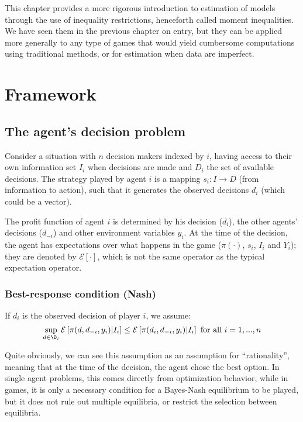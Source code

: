 This chapter provides a more rigorous introduction to estimation of models through the use of inequality restrictions, henceforth called moment inequalities. We have seen them in the previous chapter on entry, but they can be applied more generally to any type of games that would yield cumbersome computations using traditional methods, or for estimation when data are imperfect.

\section{Framework}

\subsection{The agent's decision problem}

Consider a situation with $n$ decision makers indexed by $i$, having access to their own information set $I_i$ when decisions are made and $D_i$ the set of available decisions. The strategy played by agent $i$ is a mapping $s_i:I \to D$ (from information to action), such that it generates the observed decisions $d_i$ (which could be a vector). 

The profit function of agent $i$ is determined by his decision ($d_i$), the other agents' decisions ($d_{-i}$) and other environment variables $y_i$. At the time of the decision, the agent has expectations over what happens in the game ($\pi(\cdot)$, $s_i$, $I_i$ and $Y_i$); they are denoted by $\mathcal{E}\left[\cdot\right]$, which is not the same operator as the typical expectation operator.

\subsubsection{Best-response condition (Nash)}

If $d_i$ is the observed decision of player $i$, we assume: $$ \sup_{d\in\D_i} \mathcal{E}\left[ \pi(d, d_{-i}, y_i) | I_i \right] \leq \mathcal{E}\left[ \pi(d_i, d_{-i}, y_i) | I_i \right]  \text{ for all } i = 1, ..., n $$

Quite obviously, we can see this assumption as an assumption for ``rationality'', meaning that at the time of the decision, the agent chose the best option. In single agent problems, this comes directly from optimization behavior, while in games, it is only a necessary condition for a Bayes-Nash equilibrium to be played, but it does not rule out multiple equilibria, or restrict the selection between equilibria.

